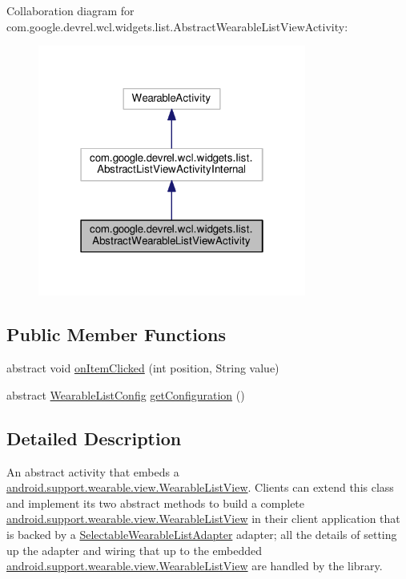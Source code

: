 Collaboration diagram for com.\+google.\+devrel.\+wcl.\+widgets.\+list.\+Abstract\+Wearable\+List\+View\+Activity\+:\nopagebreak
\begin{figure}[H]
\begin{center}
\leavevmode
\includegraphics[width=250pt]{da/d0a/classcom_1_1google_1_1devrel_1_1wcl_1_1widgets_1_1list_1_1AbstractWearableListViewActivity__coll__graph}
\end{center}
\end{figure}
\subsection*{Public Member Functions}
\begin{DoxyCompactItemize}
\item 
abstract void \hyperlink{classcom_1_1google_1_1devrel_1_1wcl_1_1widgets_1_1list_1_1AbstractWearableListViewActivity_a2846ac8d8bf01ce575387a9d6598e2c7}{on\+Item\+Clicked} (int position, String value)
\item 
abstract \hyperlink{classcom_1_1google_1_1devrel_1_1wcl_1_1widgets_1_1list_1_1WearableListConfig}{Wearable\+List\+Config} \hyperlink{classcom_1_1google_1_1devrel_1_1wcl_1_1widgets_1_1list_1_1AbstractWearableListViewActivity_a5b8d193250e103755ce1071721885059}{get\+Configuration} ()
\end{DoxyCompactItemize}


\subsection{Detailed Description}
An abstract activity that embeds a \hyperlink{}{android.\+support.\+wearable.\+view.\+Wearable\+List\+View}. Clients can extend this class and implement its two abstract methods to build a complete \hyperlink{}{android.\+support.\+wearable.\+view.\+Wearable\+List\+View} in their client application that is backed by a \hyperlink{classcom_1_1google_1_1devrel_1_1wcl_1_1widgets_1_1list_1_1SelectableWearableListAdapter}{Selectable\+Wearable\+List\+Adapter} adapter; all the details of setting up the adapter and wiring that up to the embedded \hyperlink{}{android.\+support.\+wearable.\+view.\+Wearable\+List\+View} are handled by the library.

